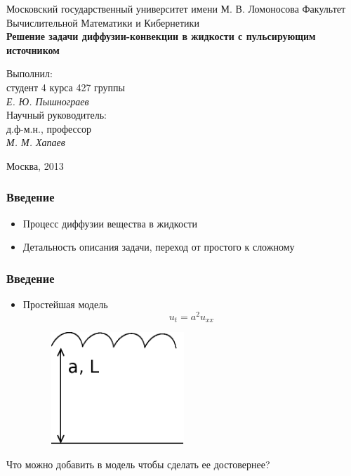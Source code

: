 \documentclass[10pt,pdf,hyperref={unicode}]{beamer}
\begin{document}
\begin{frame}
\begin{center}
    Московский государственный университет имени М. В. Ломоносова
    \bigskip
    Факультет Вычислительной Математики и Кибернетики\\[5mm]

    \textsf{\large\bfseries
        Решение задачи диффузии-конвекции в жидкости с пульсирующим источником
    }\\[5mm]

    \begin{flushright}
        \parbox{0.5\textwidth}{
            Выполнил:\\
            студент 4 курса 427 группы\\
            \emph{Е. Ю. Пышнограев}\\[3mm]
            Научный руководитель:\\
            д.ф-м.н., профессор\\
            \emph{М. М. Хапаев}
        }
    \end{flushright}

    \vspace{\fill}
    Москва, 2013
\end{center}
\end{frame}

\begin{frame}
  \frametitle{Введение}
  \begin{itemize}
    \item Процесс диффузии вещества в жидкости
      \pause
    \item Детальность описания задачи, переход от простого к сложному
  \end{itemize}
\end{frame}

\begin{frame}
  \frametitle{Введение}
  \begin{itemize}
    \item Простейшая модель
      \begin{equation*}
        u_t = a^2 u_{xx}
      \end{equation*}
      \begin{figure}[ht]
        \begin{center}
          \includegraphics[width=5cm]{int1.eps}
        \end{center}
      \end{figure}
  \end{itemize}
  \pause
  Что можно добавить в модель чтобы сделать ее достовернее?
\end{frame}
\end{document}
